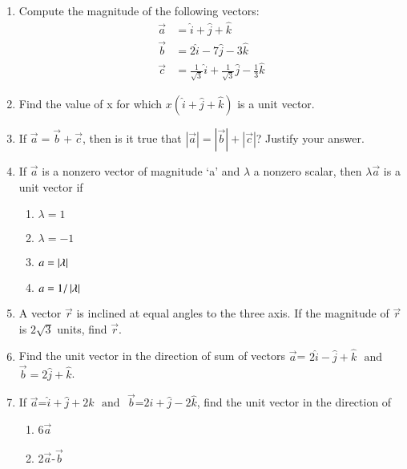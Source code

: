 \begin{enumerate}[label=\thesubsection.\arabic*,ref=\thesubsection.\theenumi]
\item Compute the magnitude of the following vectors:
\begin{align}
	\vec{a}&=\hat{i}+\hat{j}+\hat{k}
	\\
	\vec{b}&=2\hat{i}-7\hat{j}-3\hat{k}
	\\
	\vec{c}&=\frac{1}{\sqrt{3}}\hat{i}+\frac{1}{\sqrt{3}}\hat{j}-\frac{1}{3}\hat{k}
\end{align}
    \solution 
		
\item Find the value of x for which $x(\hat{i}+\hat{j}+\hat{k})$ is a unit vector.\\
	\solution
		
\item If $\vec{a}=\vec{b}+\vec{c}$, then is it true that $|\vec{a}|=|\vec{b}|+|\vec{c}|$? Justify your answer.\\
	\solution
		
\item If $\overrightarrow {a}$ is a nonzero vector of magnitude `a' and $\lambda$ a nonzero scalar, then $\lambda\overrightarrow {a}$ is a unit vector if
\begin{enumerate} 
\item $\lambda=1$ 
\item $\lambda=-1$
\item $a=\left\vert\lambda\right\vert$
\item $a=1/\left\vert\lambda\right\vert$  
\end{enumerate}
\item A vector $\vec{r}$ is inclined at equal angles to the three axis. If the magnitude of $\vec{r}$ is $2\sqrt{3}$ units, find $\vec{r}$.
\item Find the unit vector in the direction of sum of vectors $\vec{a}$= $2\hat{i}-\hat{j}+\hat{k}$ $\text{ and }$ $\vec{b}=2\hat{j}+\hat{k}$.
\item If $\vec{a}$=$\hat{i}+\hat{j}+2\hat{k}$ $\text{ and }$ $\vec{b}$=$2\hat{i}+\hat{j}-2\hat{k}$, find the unit vector in the direction of
	\begin{enumerate}
		\item 6$\vec{a}$   
		\item 2$\vec{a}$-$\vec{b}$
	\end{enumerate}


\end{enumerate}

